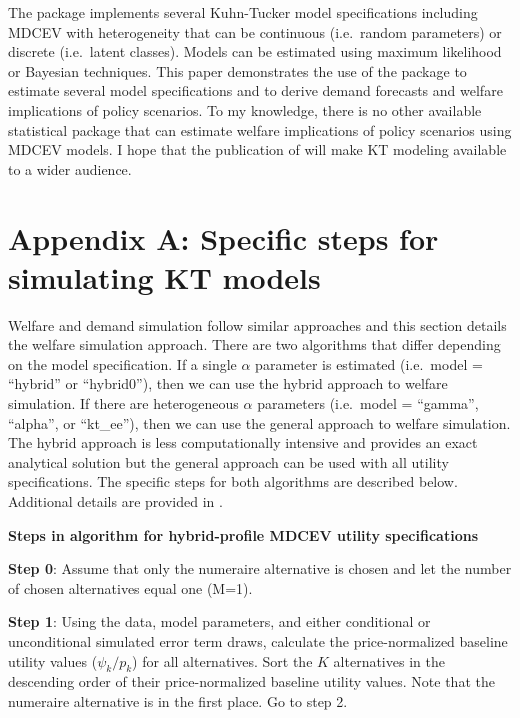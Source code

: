 The  package implements several Kuhn-Tucker model
specifications including MDCEV with heterogeneity that can be continuous
(i.e.~random parameters) or discrete (i.e.~latent classes). Models can
be estimated using maximum likelihood or Bayesian techniques. This paper
demonstrates the use of the package to estimate several model
specifications and to derive demand forecasts and welfare implications
of policy scenarios. To my knowledge, there is no other available
statistical package that can estimate welfare implications of policy
scenarios using MDCEV models. I hope that the publication of
 will make KT modeling available to a wider audience.

\hypertarget{appendix-a-specific-steps-for-simulating-kt-models}{%
\section*{Appendix A: Specific steps for simulating KT
models}\label{appendix-a-specific-steps-for-simulating-kt-models}}

Welfare and demand simulation follow similar approaches and this section
details the welfare simulation approach. There are two algorithms that
differ depending on the model specification. If a single \(\alpha\)
parameter is estimated (i.e.~model = ``hybrid'' or ``hybrid0''), then we
can use the hybrid approach to welfare simulation. If there are
heterogeneous \(\alpha\) parameters (i.e.~model = ``gamma'', ``alpha'',
or ``kt\_ee''), then we can use the general approach to welfare
simulation. The hybrid approach is less computationally intensive and
provides an exact analytical solution but the general approach can be
used with all utility specifications. The specific steps for both
algorithms are described below. Additional details are provided in
\citet{lloydsmithnew2018}.

\textbf{Steps in algorithm for hybrid-profile MDCEV utility
specifications}

\textbf{Step 0}: Assume that only the numeraire alternative is chosen
and let the number of chosen alternatives equal one (M=1).

\textbf{Step 1}: Using the data, model parameters, and either
conditional or unconditional simulated error term draws, calculate the
price-normalized baseline utility values (\(\psi_k/p_k\)) for all
alternatives. Sort the \(K\) alternatives in the descending order of
their price-normalized baseline utility values. Note that the numeraire
alternative is in the first place. Go to step 2.

